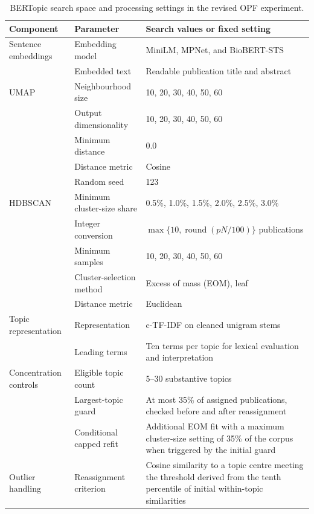 \documentclass[a4paper,fleqn]{cas-sc}
\begin{document}
    \begin{table}[htbp]
    \centering
    \caption{BERTopic search space and processing settings in the revised OPF experiment.}
    \label{tab:opf_bertopic_parameters}
    \scriptsize
    \setlength{\tabcolsep}{4pt}
    \renewcommand{\arraystretch}{1.15}
    \begin{tabularx}{\textwidth}{p{27mm}p{38mm}X}
    \toprule
    Component & Parameter & Search values or fixed setting \\
    \midrule
    Sentence embeddings & Embedding model & MiniLM, MPNet, and BioBERT-STS \\
    & Embedded text & Readable publication title and abstract \\
    \midrule
    UMAP & Neighbourhood size & 10, 20, 30, 40, 50, 60 \\
    & Output dimensionality & 10, 20, 30, 40, 50, 60 \\
    & Minimum distance & 0.0 \\
    & Distance metric & Cosine \\
    & Random seed & 123 \\
    \midrule
    HDBSCAN & Minimum cluster-size share & 0.5\%, 1.0\%, 1.5\%, 2.0\%, 2.5\%, 3.0\% \\
    & Integer conversion & $\max\{10,\operatorname{round}(pN/100)\}$ publications \\
    & Minimum samples & 10, 20, 30, 40, 50, 60 \\
    & Cluster-selection method & Excess of mass (EOM), leaf \\
    & Distance metric & Euclidean \\
    \midrule
    Topic representation & Representation & c-TF-IDF on cleaned unigram stems \\
    & Leading terms & Ten terms per topic for lexical evaluation and interpretation \\
    \midrule
    Concentration controls & Eligible topic count & 5--30 substantive topics \\
    & Largest-topic guard & At most 35\% of assigned publications, checked before and after reassignment \\
    & Conditional capped refit & Additional EOM fit with a maximum cluster-size setting of 35\% of the corpus when triggered by the initial guard \\
    \midrule
    Outlier handling & Reassignment criterion & Cosine similarity to a topic centre meeting the threshold derived from the tenth percentile of initial within-topic similarities \\

\end{tabularx}
\end{table}
\end{document}
